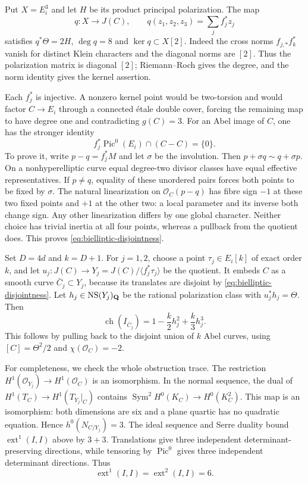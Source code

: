 Put $X=E_i^3$ and let $H$ be its product principal polarization. The map
\[
 q:X\longrightarrow J(C),\qquad q(z_1,z_2,z_3)=\sum_j f_j^*z_j
\]
satisfies $q^*\Theta=2H$, $\deg q=8$ and $\ker q\subset X[2]$. Indeed the cross norms $f_{j,*}f_k^*$ vanish for distinct Klein characters and the diagonal norms are $[2]$. Thus the polarization matrix is diagonal $[2]$; Riemann--Roch gives the degree, and the norm identity gives the kernel assertion.

Each $f_j^*$ is injective. A nonzero kernel point would be two-torsion and would factor $C\to E_i$ through a connected \'etale double cover, forcing the remaining map to have degree one and contradicting $g(C)=3$. For an Abel image of $C$, one has the stronger identity
\begin{equation}\label{eq:bielliptic-disjointness}
 f_j^*\operatorname{Pic}^0(E_i)\cap(C-C)=\{0\}.
\end{equation}
To prove it, write $p-q=f_j^*M$ and let $\sigma$ be the involution. Then $p+\sigma q\sim q+\sigma p$. On a nonhyperelliptic curve equal degree-two divisor classes have equal effective representatives. If $p\ne q$, equality of these unordered pairs forces both points to be fixed by $\sigma$. The natural linearization on $\mathcal O_C(p-q)$ has fibre sign $-1$ at these two fixed points and $+1$ at the other two: a local parameter and its inverse both change sign. Any other linearization differs by one global character. Neither choice has trivial inertia at all four points, whereas a pullback from the quotient does. This proves \eqref{eq:bielliptic-disjointness}.

Set $D=4d$ and $k=D+1$. For $j=1,2$, choose a point
$\tau_j\in E_i[k]$ of exact order $k$, and let
$u_j:J(C)\to Y_j=J(C)/\langle f_j^*\tau_j\rangle$ be the quotient.
It embeds $C$ as a smooth curve $\bar C_j\subset Y_j$, because its
translates are disjoint by \eqref{eq:bielliptic-disjointness}.
Let $h_j\in\operatorname{NS}(Y_j)_{\mathbf Q}$ be the rational polarization
class with $u_j^*h_j=\Theta$. Then
\[
 \operatorname{ch}(I_{\bar C_j})=1-\frac{k}{2}h_j^2+\frac{k}{3}h_j^3.
\]
This follows by pulling back to the disjoint union of $k$ Abel curves, using $[C]=\Theta^2/2$ and $\chi(\mathcal O_C)=-2$.

For completeness, we check the whole obstruction trace. The restriction $H^1(\mathcal O_{Y_j})\to H^1(\mathcal O_C)$ is an isomorphism. In the normal sequence, the dual of $H^1(T_C)\to H^1(T_{Y_j}|_C)$ contains
$\operatorname{Sym}^2H^0(K_C)\to H^0(K_C^2)$. This map is an isomorphism: both dimensions are six and a plane quartic has no quadratic equation. Hence $h^0(N_{C/Y_j})=3$.
The ideal sequence and Serre duality bound $\operatorname{ext}^1(I,I)$ above by $3+3$. Translations give three independent determinant-preserving directions, while tensoring by $\operatorname{Pic}^0$ gives three independent determinant directions. Thus
\[
 \operatorname{ext}^1(I,I)=\operatorname{ext}^2(I,I)=6.
\]

